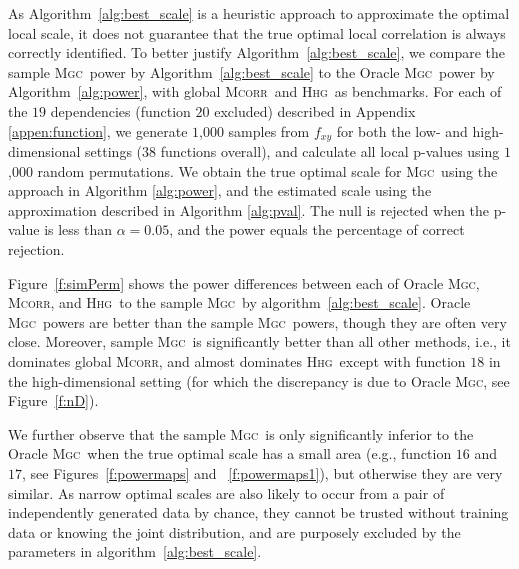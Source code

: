 \documentclass[11pt]{article}
\providecommand{\sct}[1]{{\normalfont\textsc{#1}}}
\newcommand{\Mgc}{\sct{Mgc}}
\newcommand{\Hhg}{\sct{Hhg}}
\newcommand{\Mcorr}{\sct{Mcorr}}
\begin{document}
As Algorithm~\ref{alg:best_scale} is a heuristic approach to approximate the optimal local scale, it does not guarantee that the true optimal local correlation is always correctly identified. To better justify Algorithm~\ref{alg:best_scale}, we compare the sample \Mgc~power by Algorithm~\ref{alg:best_scale} to the Oracle \Mgc~power by Algorithm~\ref{alg:power}, with  global \Mcorr~and \Hhg~as benchmarks. For each of the $19$ dependencies (function $20$ excluded) described in Appendix \ref{appen:function}, we generate $1$,$000$ samples from $f_{xy}$ for both the low- and high-dimensional settings ($38$ functions overall), and calculate all local p-values using $1$,$000$ random permutations. 
We obtain the true optimal scale for \Mgc~using the approach in Algorithm \ref{alg:power}, and the estimated scale using the approximation described in Algorithm \ref{alg:pval}.  
The null is rejected when the p-value is less than $\alpha=0.05$, and the power equals the percentage of correct rejection. 

Figure~\ref{f:simPerm} shows the power differences between each of Oracle \Mgc, \Mcorr, and \Hhg~to the sample \Mgc~by algorithm~\ref{alg:best_scale}. Oracle \Mgc~powers are better than the sample \Mgc~powers, though they are often very close. Moreover, sample \Mgc~is significantly better than all other methods, i.e., it dominates global \Mcorr, and almost dominates \Hhg~except with function $18$ in the high-dimensional setting (for which the discrepancy is due to Oracle \Mgc, see Figure~\ref{f:nD}). 

We further observe that the sample \Mgc~is only significantly inferior to the Oracle \Mgc~when the true optimal scale has a small area (e.g., function $16$ and $17$, see Figures~\ref{f:powermaps} and ~\ref{f:powermaps1}), but otherwise they are very similar. As narrow optimal scales are also likely to occur from a pair of independently generated data by chance, they cannot be trusted without training data or knowing the joint distribution, and are purposely excluded by the parameters in algorithm~\ref{alg:best_scale}.
\end{document}
